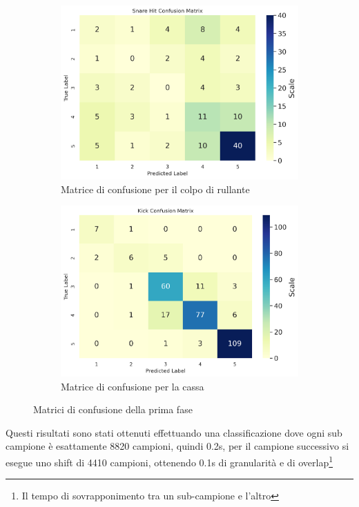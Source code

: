 \begin{figure}[h]
	\begin{subfigure}{.5\linewidth}
		\includegraphics[width=\linewidth]{./immagini/second_classification/sn_hit_cm.png}
		\caption{Matrice di confusione per il colpo di rullante}
		\label{fig:1c}
	\end{subfigure}\hfill
	\begin{subfigure}{.5\linewidth}
		\includegraphics[width=\linewidth]{./immagini/second_classification/kick_cm.png}
		\caption{Matrice di confusione per la cassa}
		\label{fig:1d}
	\end{subfigure}
	\caption{Matrici di confusione della prima fase}
	\label{fig:1}
\end{figure}

Questi risultati sono stati ottenuti effettuando una classificazione dove ogni sub campione è esattamente 8820 campioni, quindi 0.2s, per il campione successivo si esegue uno shift di 4410 campioni, ottenendo 0.1s di granularità e di overlap\footnote{Il tempo di sovrapponimento tra un sub-campione e l'altro}\\

